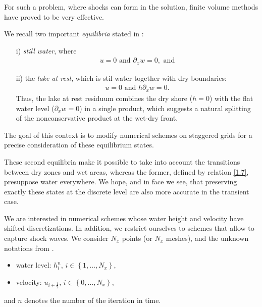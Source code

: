 \documentclass[11pt,a4paper,center,notitlepage]{article}
\numberwithin{equation}{section}
\begin{document}
For such a problem, where shocks can form in the solution, finite volume methods have proved to be very effective.

We recall two important \textit{equilibria} stated in \cite[p. 759]{Chen2017}:
\begin{itemize}
\item[i)] \textit{still water}, where
\begin{align}
u = 0 \mbox{ and } \partial _x w =0, \mbox{ and}
\end{align}
\item[ii)] the \textit{lake at rest}, which is stil water together with dry boundaries:
\begin{align}
u = 0 \mbox{ and } h \partial_x w =0.
\end{align}
Thus, the lake at rest residuum combines the dry shore ($h=0$) with the flat water level ($\partial _x w = 0$) in a single product, which suggests a natural splitting of the nonconservative product at the wet-dry front. 
\end{itemize}
The goal of this context is to modify numerical schemes on staggered grids for a precise consideration of these equilibrium states.

These second equilibria make it possible to take into account the transitions between dry zones and wet areas, whereas the former, defined by relation \eqref{1.7}, presuppose water everywhere. We hope, and in face we see, that preserving exactly these states at the discrete level are also more accurate in the transient case.

We are interested in numerical schemes whose water height and velocity have shifted discretizations. In addition, we restrict ourselves to schemes that allow to capture shock waves. We consider $N_x$ points (or $N_x$ meshes), and the unknown notations from \cite{Herbin2013}.
\begin{itemize}
\item water level: $h_i^n$, $i\in \left\{1,\ldots,N_x\right\}$, 
\item velocity: $u_{i+\frac{1}{2}}$, $i\in \left\{0,\ldots,N_x\right\}$,
\end{itemize}
and $n$ denotes the number of the iteration in time. 
\end{document}
